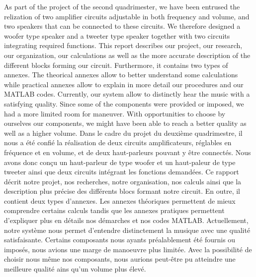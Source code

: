 \biabstract
{
    As part of the project of the second quadrimester, we have been entrused the relization of two amplifier circuits adjustable in both frequency and volume, and two speakers that can be connected to these circuits. We therefore designed a woofer type speaker and a tweeter type speaker together with two circuits integrating required functions. This report describes our project, our research, our organization, our calculations as well as the more accurate description of the different blocks forming our circuit. Furthermore, it contains two types of annexes. The theorical annexes allow to better understand some calculations while practical annexes allow to explain in more detail our procedures and our MATLAB codes. Currently, our system allow to distinctly hear the music with a satisfying quality. Since some of the components were provided or imposed, we had a more limited room for maneuver. With opportunities to choose by ourselves our components, we might have been able to reach a better quality as well as a higher volume.
\newline
}
{
    Dans le cadre du projet du deuxième quadrimestre, il nous a été confié la réalisation de deux circuits amplificateurs, réglables en fréquence et en volume, et de deux haut-parleurs pouvant y être connectés. Nous avons donc conçu un haut-parleur de type woofer et un haut-paleur de type tweeter ainsi que deux circuits intégrant les fonctions demandées.
Ce rapport décrit notre projet, nos recherches, notre organisation, nos calculs ainsi que la description plus précise des différents blocs formant notre circuit. En outre, il contient deux types d'annexes. Les annexes théoriques permettent de mieux comprendre certains calculs tandis que les annexes pratiques permettent d'expliquer plus en détails nos démarches et nos codes MATLAB.
Actuellement, notre système nous permet d'entendre distinctement la musique avec une qualité satisfaisante. Certains composants nous ayants préalablement été fournis ou imposés, nous avions une marge de manoeuvre plus limitée.
Avec la possibilité de choisir nous même nos composants, nous aurions peut-être pu atteindre une meilleure qualité ains qu'un volume plus élevé.
}
